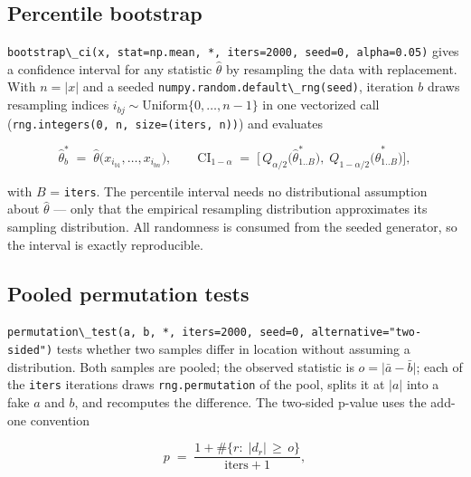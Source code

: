 \documentclass[
  10pt,
]{article}
\newcommand{\passthrough}[1]{#1}
\begin{document}
\subsection{Percentile bootstrap}\label{percentile-bootstrap}

\passthrough{\lstinline!bootstrap\_ci(x, stat=np.mean, *, iters=2000, seed=0, alpha=0.05)!}
gives a confidence interval for any statistic \(\hat{\theta}\) by
resampling the data with replacement. With \(n = |x|\) and a seeded
\passthrough{\lstinline!numpy.random.default\_rng(seed)!}, iteration
\(b\) draws resampling indices
\(i_{bj} \sim \mathrm{Uniform}\{0,\dots,n-1\}\) in one vectorized call
(\passthrough{\lstinline!rng.integers(0, n, size=(iters, n))!}) and
evaluates

\begin{equation}
\label{eq:stat-bootstrap}
\hat{\theta}^{*}_{b} \;=\; \hat{\theta}\big(x_{i_{b1}},\dots,x_{i_{bn}}\big),
\qquad
\mathrm{CI}_{1-\alpha}
\;=\;
\Big[\, Q_{\alpha/2}\big(\hat{\theta}^{*}_{1..B}\big),\;
Q_{1-\alpha/2}\big(\hat{\theta}^{*}_{1..B}\big) \Big],
\end{equation}

with \(B\) = \passthrough{\lstinline!iters!}. The percentile interval
needs no distributional assumption about \(\hat{\theta}\) --- only that
the empirical resampling distribution approximates its sampling
distribution. All randomness is consumed from the seeded generator, so
the interval is exactly reproducible.

\subsection{Pooled permutation tests}\label{pooled-permutation-tests}

\passthrough{\lstinline!permutation\_test(a, b, *, iters=2000, seed=0, alternative="two-sided")!}
tests whether two samples differ in location without assuming a
distribution. Both samples are pooled; the observed statistic is
\(o = \big|\bar{a} - \bar{b}\big|\); each of the
\passthrough{\lstinline!iters!} iterations draws
\passthrough{\lstinline!rng.permutation!} of the pool, splits it at
\(\lvert a\rvert\) into a fake \(a\) and \(b\), and recomputes the
difference. The two-sided p-value uses the add-one convention

\begin{equation}
\label{eq:stat-permutation}
p \;=\;
\frac{1 + \#\big\{ r :\; |d_r| \,\ge\, o \big\}}{\text{iters} + 1},
\end{equation}
\end{document}
